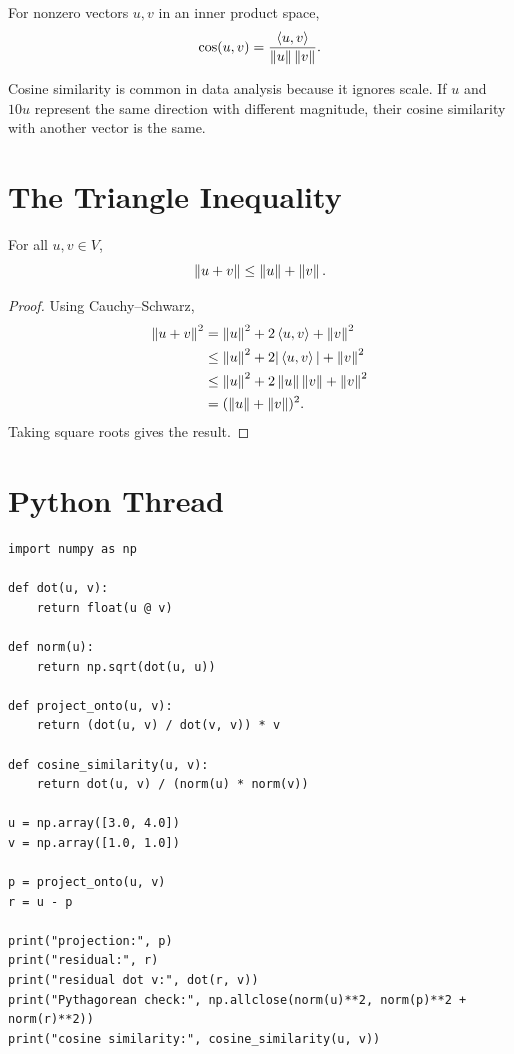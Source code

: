 \begin{definition}
For nonzero vectors $u,v$ in an inner product space,
\[
  \cos(u,v)=\frac{\left\langle u,v \right\rangle}{\left\lVert u \right\rVert\left\lVert v \right\rVert}.
\]
\end{definition}

Cosine similarity is common in data analysis because it ignores scale. If
$u$ and $10u$ represent the same direction with different magnitude, their
cosine similarity with another vector is the same.

\section{The Triangle Inequality}

\begin{theorem}
For all $u,v \in V$,
\[
  \left\lVert u+v \right\rVert \leq \left\lVert u \right\rVert+\left\lVert v \right\rVert.
\]
\end{theorem}

\begin{proof}
Using Cauchy--Schwarz,
\[
\begin{aligned}
  \left\lVert u+v \right\rVert^2
  &= \left\lVert u \right\rVert^2 + 2\left\langle u,v \right\rangle + \left\lVert v \right\rVert^2 \\
  &\leq \left\lVert u \right\rVert^2 + 2|\left\langle u,v \right\rangle| + \left\lVert v \right\rVert^2 \\
  &\leq \left\lVert u \right\rVert^2 + 2\left\lVert u \right\rVert\left\lVert v \right\rVert + \left\lVert v \right\rVert^2 \\
  &= (\left\lVert u \right\rVert+\left\lVert v \right\rVert)^2.
\end{aligned}
\]
Taking square roots gives the result.
\end{proof}

\section{Python Thread}

\begin{lstlisting}
import numpy as np

def dot(u, v):
    return float(u @ v)

def norm(u):
    return np.sqrt(dot(u, u))

def project_onto(u, v):
    return (dot(u, v) / dot(v, v)) * v

def cosine_similarity(u, v):
    return dot(u, v) / (norm(u) * norm(v))

u = np.array([3.0, 4.0])
v = np.array([1.0, 1.0])

p = project_onto(u, v)
r = u - p

print("projection:", p)
print("residual:", r)
print("residual dot v:", dot(r, v))
print("Pythagorean check:", np.allclose(norm(u)**2, norm(p)**2 + norm(r)**2))
print("cosine similarity:", cosine_similarity(u, v))
\end{lstlisting}

